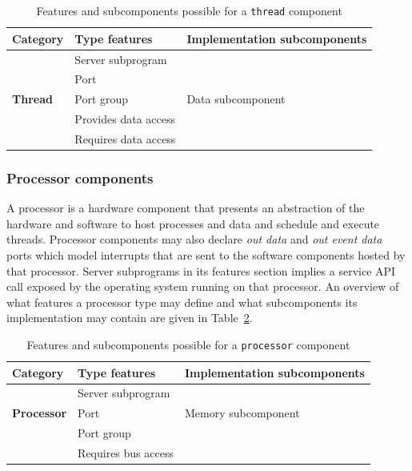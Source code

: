 \begin{table}
\centering
\begin{tabular}{|l|l|l|}
\hline
\textbf{Category} & \textbf{Type features} & \textbf{Implementation
  subcomponents} \\
\hline
 & Server subprogram & \\
 & Port & \\
\textbf{Thread} & Port group & Data subcomponent\\
 & Provides data access & \\
 & Requires data access & \\
\hline
\end{tabular}
\caption{Features and subcomponents possible for a \texttt{thread}
  component}
\label{tab:thread_rules}
\end{table}

\subsubsection{Processor components}
A processor is a hardware component that presents an abstraction of
the hardware and software to host processes and data and schedule and
execute threads. Processor components may also declare \emph{out data}
and \emph{out event data} ports which model interrupts that are sent
to the software components hosted by that processor. Server
subprograms in its features section implies a service API call exposed
by the operating system running on that processor. An overview of what
features a processor type may define and what subcomponents its
implementation may contain are given in
Table~\ref{tab:processor_rules}.

\begin{table}
\centering
\begin{tabular}{|l|l|l|}
\hline
\textbf{Category} & \textbf{Type features} & \textbf{Implementation
  subcomponents} \\
\hline
 & Server subprogram & \\
\textbf{Processor} & Port & Memory subcomponent\\
 & Port group & \\
 & Requires bus access & \\
\hline
\end{tabular}
\caption{Features and subcomponents possible for a \texttt{processor}
  component}
\label{tab:processor_rules}
\end{table}

